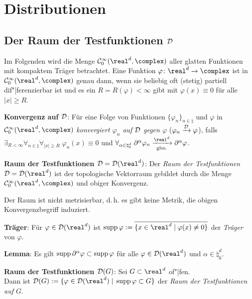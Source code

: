 \section{%
    Distributionen%
}

\subsection{%
    Der Raum der Testfunktionen \texorpdfstring{$\mathcal{D}$}{D}%
}

Im Folgenden wird die Menge $\C_0^\infty(\real^d, \complex)$
aller glatten Funktionen mit kompaktem Träger betrachtet.
Eine Funktion $\varphi\colon \real^d \rightarrow \complex$ ist in
$\C_0^\infty(\real^d, \complex)$ genau dann, wenn
sie beliebig oft (stetig) partiell dif"|ferenzierbar ist und
es ein $R = R(\varphi) < \infty$ gibt mit $\varphi(x) \equiv 0$ für alle
$|x| \ge R$.

\textbf{Konvergenz auf $\mathcal{D}$}:
Für eine Folge von Funktionen $\{\varphi_n\}_{n \in \natural}$ und
$\varphi$ in $\C_0^\infty(\real^d, \complex)$
\emph{konvergiert $\varphi_n$ auf $\mathcal{D}$ gegen $\varphi$}
($\varphi_n \xrightarrow{\mathcal{D}} \varphi$), falls
$\exists_{R < \infty} \forall_{n \in \natural} \forall_{|x| \ge R}\;
\varphi_n(x) \equiv 0$ und
$\forall_{\alpha \in \natural_0^d}\;
\partial^\alpha \varphi_n \xrightarrow[\text{glm.}]{\real^d}
\partial^\alpha \varphi$.

\textbf{Raum der Testfunktionen $\D = \D(\real^d)$}:
Der \emph{Raum der Testfunktionen}
$\D = \D(\real^d)$ ist der topologische Vektorraum gebildet durch die Menge
$\C_0^\infty(\real^d, \complex)$ und obiger Konvergenz.

Der Raum ist nicht metrisierbar, d.\,h. es gibt keine Metrik, die obigen
Konvergenzbegriff induziert.

\linie

\textbf{Träger}:
Für $\varphi \in \D(\real^d)$ ist
$\supp \varphi := \overline{\{x \in \real^d \;|\; \varphi(x) \not= 0\}}$
der \emph{Träger} von $\varphi$.

\textbf{Lemma}:
Es gilt $\operatorname{supp} \partial^\alpha \varphi \subset \operatorname{supp} \varphi$ für alle
$\varphi \in \D(\real^d)$ und $\alpha \in \natural_0^d$.

\textbf{Raum der Testfunktionen $\mathcal{D}(G)$}:
Sei $G \subset \real^d$ of"|fen.\\
Dann ist $\D(G) := \{\varphi \in \D(\real^d) \;|\; \supp \varphi \subset G\}$
der \emph{Raum der Testfunktionen auf $G$}.

\linie

